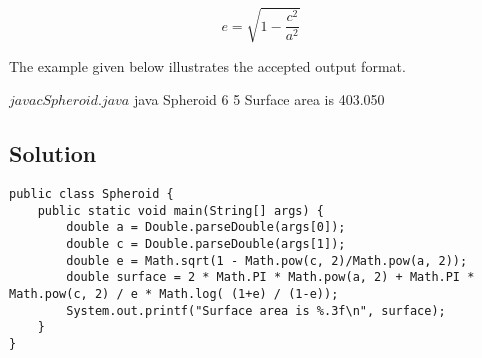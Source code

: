 \documentclass[12pt,letterpaper,twoside]{article}
\begin{document}
\begin{equation}
e = \sqrt{1 - \frac{c^2}{a^2}}
\label{eq4}
\end{equation}

The example given below illustrates the accepted output format.

\begin{terminal}
$ javac Spheroid.java
$ java Spheroid 6 5
Surface area is 403.050
\end{terminal}

\subsection*{Solution}

\lstset{language=Java,tabsize=2}
\begin{lstlisting}
public class Spheroid {
	public static void main(String[] args) {
		double a = Double.parseDouble(args[0]);
		double c = Double.parseDouble(args[1]);
		double e = Math.sqrt(1 - Math.pow(c, 2)/Math.pow(a, 2));
		double surface = 2 * Math.PI * Math.pow(a, 2) + Math.PI * Math.pow(c, 2) / e * Math.log( (1+e) / (1-e));
		System.out.printf("Surface area is %.3f\n", surface);
	}
}
\end{lstlisting}
\end{document}
